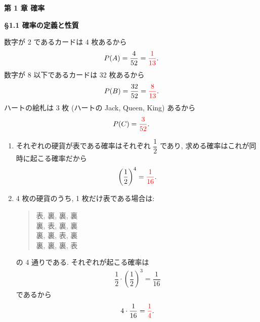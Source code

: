 {
	\centering
	{\textbf{第 1 章 \indent 確率}} \\
}

{\textbf{\S 1.1 \indent 確率の定義と性質}}

\basic

数字が 2 であるカードは 4 枚あるから
\begin{align}
	P(A) = \frac{4}{52} = \textcolor{red}{\frac{1}{13}}.
\end{align}
数字が 8 以下であるカードは 32 枚あるから
\begin{align}
	P(B) = \frac{32}{52} = \textcolor{red}{\frac{8}{13}}.
\end{align}
ハートの絵札は 3 枚 (ハートの Jack, Queen, King) あるから
\begin{align}
	P(C) = \textcolor{red}{\frac{3}{52}}.
\end{align}

\begin{enumerate}
	\item{
		それぞれの硬貨が表である確率はそれぞれ $\dfrac{1}{2}$ であり, 求める確率はこれが同時に起こる確率だから
		\begin{align}
			\left(\frac{1}{2}\right)^{4} = \textcolor{red}{\frac{1}{16}}.
		\end{align}
	}
	\item{
		4 枚の硬貨のうち, 1 枚だけ表である場合は: 
		\begin{quote}
			表, 裏, 裏, 裏 \\
			裏, 表, 裏, 裏 \\
			裏, 裏, 表, 裏 \\
			裏, 裏, 裏, 表
		\end{quote}
		の 4 通りである.
		それぞれが起こる確率は
		\begin{align}
			\dfrac{1}{2}\cdot\left(\dfrac{1}{2}\right)^{3} = \dfrac{1}{16}
		\end{align}
		であるから
		\begin{align}
			4\cdot\dfrac{1}{16} = \textcolor{red}{\dfrac{1}{4}}.
		\end{align}
	}
\end{enumerate}

